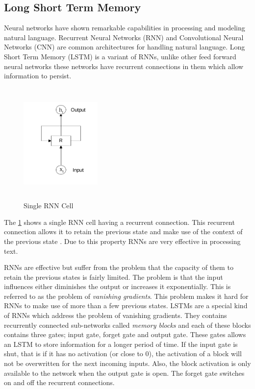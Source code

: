 \subsection{Long Short Term Memory}
Neural networks have shown remarkable capabilities in processing and modeling natural language. Recurrent Neural Networks (RNN) and Convolutional Neural Networks (CNN) are common architectures for handling natural language. Long Short Term Memory (LSTM)\cite{hochreiter1997long} is a variant of RNNs, unlike other feed forward neural networks these networks have recurrent connections in them which allow information to persist.

\begin{figure}[!ht]
    \centering
    \includegraphics[width=4cm,height=6cm,keepaspectratio]{pics/rnn_cell.jpg}
    \captionsetup{justification=centering,margin=2cm}
    \caption{Single RNN Cell}
    \label{fig:rnn_single_cell}
\end{figure}

The \ref{fig:rnn_single_cell} shows a single RNN cell having a recurrent connection. This recurrent connection allows it to retain the previous state and make use of the context of the previous state \cite{graves2009novel}. Due to this property RNNs are very effective in processing text. 

RNNs are effective but suffer from the problem that the capacity of them to retain the previous states is fairly limited. The problem is that the input influences either diminishes the output or increases it exponentially. This is referred to as the problem of \textit{vanishing gradients}\cite{hochreiter2001gradient}. This problem makes it hard for RNNs to make use of more than a few previous states. LSTMs are a special kind of RNNs which address the problem of vanishing gradients. They contains recurrently connected sub-networks called \textit{memory blocks} and each of these blocks contains three gates; input gate, forget gate and output gate. These gates allows an LSTM to store information for a longer period of time. If the input gate is shut, that is if it has no activation (or close to 0), the activation of a block will not be overwritten for the next incoming inputs. Also, the block activation is only available to the network when the output gate is open. The forget gate switches on and off the recurrent connections.

